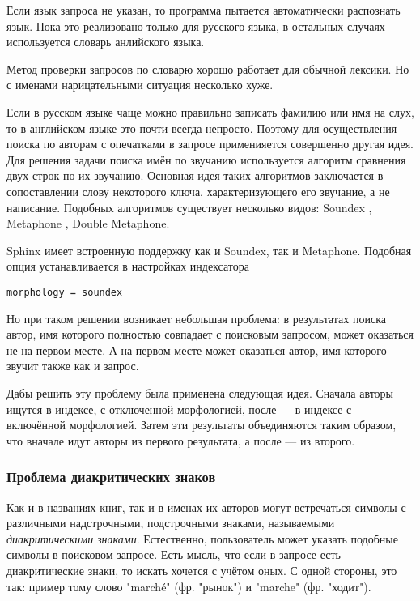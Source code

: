 Если язык запроса не указан, то программа пытается автоматически распознать язык.
Пока это реализовано только для русского языка, в остальных случаях используется словарь анлийского языка.

Метод проверки запросов по словарю хорошо работает для обычной лексики. Но с именами нарицательными ситуация несколько хуже.

Если в русском языке чаще можно правильно записать фамилию или имя на слух, то в английском языке это почти всегда непросто.
Поэтому для осуществления поиска по авторам с опечатками в запросе применияется совершенно другая идея.
Для решения задачи поиска имён по звучанию используется алгоритм сравнения двух строк по их звучанию.
Основная идея таких алгоритмов заключается в сопоставлении слову некоторого ключа, характеризующего его звучание, а не написание.
Подобных алгоритмов существует несколько видов: Soundex \cite{soundex}, Metaphone \cite{metaphone}, Double Metaphone.

Sphinx имеет встроенную поддержку как и Soundex, так и Metaphone. Подобная опция устанавливается в настройках индексатора
\begin{verbatim}
morphology = soundex
\end{verbatim}

Но при таком решении возникает небольшая проблема: в результатах поиска автор, имя которого полностью совпадает с поисковым запросом, может оказаться не на первом месте. А на первом месте может оказаться автор, имя которого звучит также как и запрос.

Дабы решить эту проблему была применена следующая идея. 
Сначала авторы ищутся в индексе, с отключенной морфологией, после --- в индексе с включённой морфологией.
Затем эти результаты объединяются таким образом, что вначале идут авторы из первого результата, а после --- из второго.

\subsubsection{Проблема диакритических знаков}

Как и в названиях книг, так и в именах их авторов могут встречаться символы с различными надстрочными, подстрочными знаками, называемыми {\em диакритическими знаками}. Естественно, пользователь может указать подобные символы в поисковом запросе.
Есть мысль, что если в запросе есть диакритические знаки, то искать хочется с учётом оных. С одной стороны, это так: пример тому слово "marché" (фр. "рынок") и "marche" (фр. "ходит"). 

